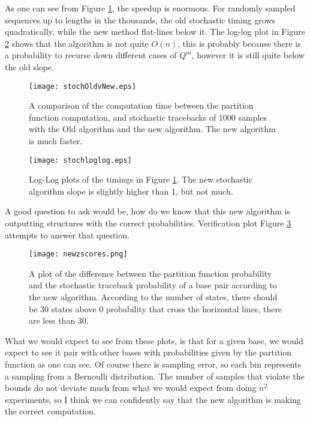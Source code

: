 As one can see from Figure \ref{fig:stochOvN}, the speedup is
enormous. For randomly sampled sequences up to lengths in the
thousands, the old stochastic timing grows quadratically, while the
new method flat-lines below it. The log-log plot in Figure
\ref{fig:stochLogLog} shows that the algorithm is not quite $O(n)$,
this is probably because there is a probability to recurse down
different cases of $Q^m$, however it is still quite below the old
slope.
\begin{figure}[t]
\texttt{[image: stochOldvNew.eps]}
\caption[Stochastic Traceback Speedups]{A comparison of the
  computation time between the partition function computation, and
  stochastic tracebacks of 1000 samples with the Old algorithm and the
  new algorithm. The new algorithm is much faster.}
\label{fig:stochOvN}
\end{figure}
\begin{figure}[t]
\texttt{[image: stochloglog.eps]}
\caption[Stochastic Traceback Speedups Log-Log Plot]{Log-Log plots of the timings in Figure
  \ref{fig:stochOvN}. The new stochastic algorithm slope is slightly
  higher than 1, but not much. }
\label{fig:stochLogLog}
\end{figure}
A good question to ask would be, how do we know that this new
algorithm is outputting structures with the correct
probabilities. Verification plot Figure \ref{fig:stochV} attempts to answer that
question.
\begin{figure}
\texttt{[image: newzscores.png]}
\caption[Stochastic Traceback Verification]{A plot of the difference
  between the partition function probability and the stochastic
  traceback probability of a base pair according to the new
  algorithm. According to the number of states, there should be 30
  states above 0 probability that cross the horizontal lines, there
  are less than 30.}
\label{fig:stochV}
\end{figure}

What we would expect to see from these plots, is that for a given
base, we would expect to see it pair with other bases with
probabilities given by the partition function as one can see. Of
course there is sampling error, so each bin represents a sampling from
a Bernoulli distribution. The number of samples that violate the
bounds do not deviate much from what we would expect from doing $n^2$
experiments, so I think we can confidently say that the new algorithm
is making the correct computation.



